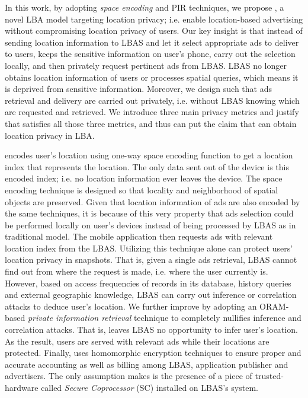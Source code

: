 In this work, by adopting \textit{space encoding} and PIR techniques, we propose \codename, a novel LBA model targeting location privacy; i.e. enable location-based advertising without compromising location privacy of users. 
Our key insight is that instead of sending location information to LBAS and let it select appropriate ads to deliver to users, \codename keeps the sensitive information on user's phone, carry out the selection locally, and then privately request pertinent ads from LBAS. LBAS no longer obtains location information of users or processes spatial queries, which means it is deprived from sensitive information. Moreover, we design \codename such that ads retrieval and delivery are carried out privately, i.e. without LBAS knowing which are requested and retrieved. We introduce three main privacy metrics and justify that \codename satisfies all those three metrics, and thus can put the claim that \codename can obtain location privacy in LBA.

\codename encodes user's location using one-way space encoding function to get a location index that represents the location. The only data sent out of the device is this encoded index; i.e. no location information ever leaves the device. The space encoding technique is designed so that locality and neighborhood of spatial objects are preserved. Given that location information of ads are also encoded by the same techniques, it is because of this very property that ads selection could be performed locally on user's devices instead of being processed by LBAS as in traditional model. The mobile application then requests ads with relevant location index from the LBAS. Utilizing this technique alone can protect users' location privacy in snapshots. That is, given a single ads retrieval, LBAS cannot find out from where the request is made, i.e. where the user currently is. However, based on access frequencies of records in its database, history queries and external geographic knowledge, LBAS can carry out inference or correlation attacks to deduce user's location. We further improve \codename by adopting an ORAM-based \textit{private information retrieval} technique \cite{PIR_SC_2006} to completely nullifies inference and correlation attacks. That is, \codename leaves LBAS no opportunity to infer user's location. As the result, users are served with relevant ads while their locations are protected. Finally, \codename uses homomorphic encryption techniques to ensure proper and accurate accounting as well as billing among LBAS, application publisher and advertisers. The only assumption \codename makes is the presence of a piece of trusted-hardware called \textit{Secure Coprocessor} (SC) installed on LBAS's system.

